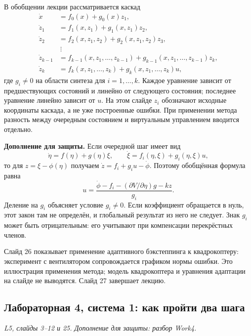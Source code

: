 В обобщении лекции рассматривается каскад
\begin{align*}
  \dot x&=f_0(x)+g_0(x)z_1,\\
  \dot z_1&=f_1(x,z_1)+g_1(x,z_1)z_2,\\
  \dot z_2&=f_2(x,z_1,z_2)+g_2(x,z_1,z_2)z_3,\\
  &\ \vdots\\
  \dot z_{k-1}&=f_{k-1}(x,z_1,\ldots,z_{k-1})
     +g_{k-1}(x,z_1,\ldots,z_{k-1})z_k,\\
  \dot z_k&=f_k(x,z_1,\ldots,z_k)
     +g_k(x,z_1,\ldots,z_k)u,
\end{align*}
где $g_i\ne0$ на области синтеза для $i=1,\ldots,k$.
Каждое уравнение зависит от предшествующих состояний и линейно от
следующего состояния; последнее уравнение линейно зависит от $u$.
На этом слайде $z_i$ обозначают исходные координаты каскада,
а не уже построенные ошибки. При применении метода разность
между очередным состоянием и виртуальным управлением вводится отдельно.

\textbf{Дополнение для защиты.}
Если очередной шаг имеет вид
\[
  \dot\eta=f(\eta)+g(\eta)\xi,\qquad
  \dot\xi=f_i(\eta,\xi)+g_i(\eta,\xi)u,
\]
то для $z=\xi-\phi(\eta)$ получаем
$\dot z=f_i+g_i u-\dot\phi$. Поэтому обобщённая формула равна
\[
  u=\frac{\dot\phi-f_i-
       (\partial V/\partial\eta)g-kz}{g_i}.
\]
Деление на $g_i$ объясняет условие $g_i\ne0$.
Если коэффициент обращается в нуль, этот закон там не определён,
и глобальный результат из него не следует.
Знак $g_i$ может быть отрицательным: его учитывают при компенсации
перекрёстных членов.

Слайд 26 показывает применение адаптивного бэкстеппинга к квадрокоптеру:
эксперимент с вентилятором сопровождается графиком нормы ошибки.
Это иллюстрация применения метода; модель квадрокоптера и уравнения
адаптации на слайде не выводятся. Слайд 27 завершает лекцию.

\subsection{Лабораторная 4, система 1: как пройти два шага}
\textit{L5, слайды 3--12 и 25. Дополнение для защиты: разбор Work4.}

